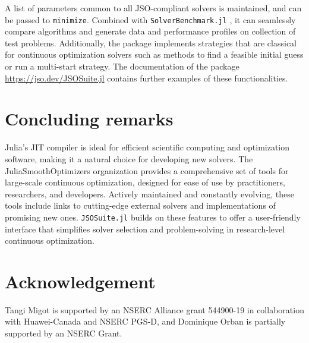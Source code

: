 \documentclass{juliacon}
\begin{document}
A list of parameters common to all JSO-compliant solvers is maintained, and can be passed to \texttt{minimize}.
%
Combined with \texttt{SolverBenchmark.jl} \cite{orban-siqueira-solverbenchmark-2020}, it can seamlessly compare algorithms and generate data and performance profiles on collection of test problems.
Additionally, the package implements strategies that are classical for continuous optimization solvers such as methods to find a feasible initial guess or run a multi-start strategy.
The documentation of the package \url{https://jso.dev/JSOSuite.jl} contains further examples of these functionalities.

\section{Concluding remarks}

Julia’s JIT compiler is ideal for efficient scientific computing and optimization software, making it a natural choice for developing new solvers.
%
The JuliaSmoothOptimizers organization provides a comprehensive set of tools for large-scale continuous optimization, designed for ease of use by practitioners, researchers, and developers.
%
Actively maintained and constantly evolving, these tools include links to cutting-edge external solvers and implementations of promising new ones. 
%
\texttt{JSOSuite.jl} builds on these features to offer a user-friendly interface that simplifies solver selection and problem-solving in research-level continuous optimization.

\section*{Acknowledgement}

Tangi Migot is supported by an NSERC Alliance grant 544900-19 in collaboration with Huawei-Canada and NSERC PGS-D,
and Dominique Orban is partially supported by an NSERC Grant.


\end{document}
